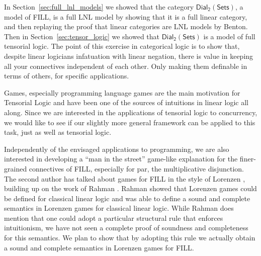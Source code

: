 \documentclass{elsarticle}
\newcommand{\dial}[0]{\mathsf{Dial_2}(\mathsf{Sets})}
\begin{document}
In Section~\ref{sec:full_lnl_models} we showed that the category
$\dial$, a model of FILL, is a full LNL model by showing that it is a
full linear category, and then replaying the proof that linear
categories are LNL models by Benton. Then in
Section~\ref{sec:tensor_logic} we showed that $\dial$ is a model of
full tensorial logic. The point of this exercise in categorical logic
is to show that, despite linear logicians infatuation with linear
negation, there is value in keeping all your connectives independent
of each other. Only making them definable in terms of others, for
specific applications.

Games, especially programming language games are the main motivation
for Tensorial Logic and have been one of the sources of intuitions in
linear logic all along. Since we are interested in the applications of
tensorial logic to concurrency, we would like to see if our slightly
more general framework can be applied to this task, just as well as
tensorial logic.

Independently of the envisaged applications to programming, we are
also interested in developing a ``man in the street'' game-like
explanation for the finer-grained connectives of FILL, especially for
par, the multiplicative disjunction. The second author has talked
about games for FILL in the style of Lorenzen \cite{dePaiva:2011},
building up on the work of Rahman
\cite{Keiff:2011,Rahman:2005}. Rahman showed that Lorenzen games could
be defined for classical linear logic \cite{Rahman:2002} and was able
to define a sound and complete semantics in Lorenzen games for
classical linear logic. While Rahman does mention that one could adopt
a particular structural rule that enforces intuitionism, we have not
seen a complete proof of soundness and completeness for this
semantics.  We plan to show that by adopting this rule we actually
obtain a sound and complete semantics in Lorenzen games for FILL.

\end{document}
